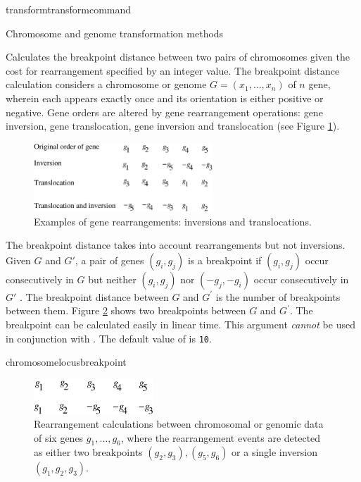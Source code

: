 \begin{command}{transform}{transformcommand}
\begin{arguments}
\begin{argumentgroup}{Chromosome and genome transformation methods}
{Calculates the breakpoint distance \cite{blanchetteetal1997}
between two pairs of chromosomes given the cost for rearrangement
specified by an integer value. The breakpoint distance calculation considers
a chromosome or genome $G = (x_1, \ldots, x_n) $ of $n$ gene, wherein each
appears exactly once and its orientation is either positive or negative. Gene
orders are altered by gene rearrangement operations: gene inversion, gene translocation,
gene inversion and translocation (see Figure \ref{fig:genomeRearrangement}). 
\bigskip
\begin{figure} [!htbp]
\begin{center}
\includegraphics[width=0.6\textwidth]{doc/figures/genomeRearrangement.pdf}
\end{center}
\caption{Examples of gene rearrangements: inversions and translocations.}
\label{fig:genomeRearrangement}
\end{figure}

The breakpoint distance takes into account rearrangements but not inversions.
Given $G$ and $G'$, a pair of genes $(g_i, g_j)$ is a breakpoint if $(g_i, g_j)$ occur 
consecutively in $G$ but neither $(g_i, g_j)$ nor $(-g_j, -g_i)$ occur
consecutively in $G'$ \cite{sankoffandblanchette1998}. The breakpoint distance between $G$
and $G^\prime$ is the number of breakpoints between them. Figure \ref{fig:distance} 
shows two breakpoints between $G$ and $G^\prime$. The breakpoint can be calculated 
easily in linear time. This argument \emph{cannot} be used in
conjunction with . %
The default value of  is \texttt{10}.} 
{chromosomelocusbreakpoint} 


\begin{figure}[!htbp]
\begin{center}
\includegraphics[width=0.4\textwidth]{doc/figures/breakpointDis.pdf}
\end{center}
\caption{Rearrangement calculations between chromosomal or genomic 
data of six genes $g_1, \ldots, g_6$, where the rearrangement events 
are detected as either two breakpoints $(g_2, g_3), (g_5, g_6)$
or a single inversion $(g_1, g_2, g_3)$.}
\label{fig:distance}
\end{figure}


\end{argumentgroup}
\end{arguments}
\end{command}
